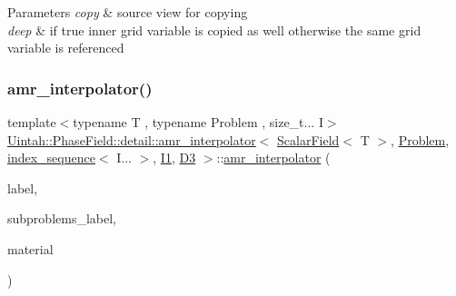 \begin{DoxyParams}{Parameters}
{\em copy} & source view for copying \\
\hline
{\em deep} & if true inner grid variable is copied as well otherwise the same grid variable is referenced \\
\hline
\end{DoxyParams}
\mbox{\label{classUintah_1_1PhaseField_1_1detail_1_1amr__interpolator_3_01ScalarField_3_01T_01_4_00_01Problemdf68628a6010a1e1526666730125c372_a8580864e454adb1e3b4edea25eb2e9d9}} 
\subsubsection{\texorpdfstring{amr\+\_\+interpolator()}{amr\_interpolator()}\hspace{0.1cm}{\footnotesize\ttfamily [2/4]}}
{\footnotesize\ttfamily template$<$typename T , typename Problem , size\+\_\+t... I$>$ \\
\hyperlink{classUintah_1_1PhaseField_1_1detail_1_1amr__interpolator}{Uintah\+::\+Phase\+Field\+::detail\+::amr\+\_\+interpolator}$<$ \hyperlink{structUintah_1_1PhaseField_1_1ScalarField}{Scalar\+Field}$<$ T $>$, \hyperlink{classUintah_1_1PhaseField_1_1Problem}{Problem}, \hyperlink{namespaceUintah_1_1PhaseField_a237de804d99512e50613aff7c94a9461}{index\+\_\+sequence}$<$ I... $>$, \hyperlink{namespaceUintah_1_1PhaseField_a547ce3002aa97fbd3ef3192a6eec8406a66f19efe774b0d2b6e5844eb2d83d305}{I1}, \hyperlink{namespaceUintah_1_1PhaseField_a12bfc68444894dffdf0cb8d9cf0cc76aa72fd61934c7ca788c49ad90629f76e78}{D3} $>$\+::\hyperlink{classUintah_1_1PhaseField_1_1detail_1_1amr__interpolator}{amr\+\_\+interpolator} (\begin{DoxyParamCaption}\item[{const Var\+Label $\ast$}]{label,  }\item[{const Var\+Label $\ast$}]{subproblems\+\_\+label,  }\item[{int}]{material }\end{DoxyParamCaption})\hspace{0.3cm}{\ttfamily [inline]}}



